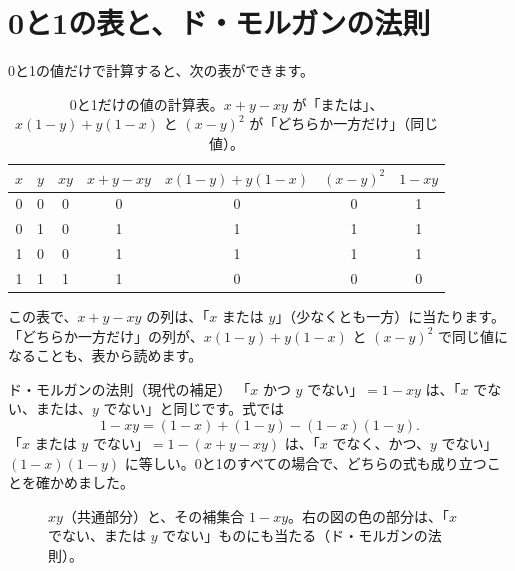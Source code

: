 \documentclass[a4paper,11pt,openany]{ltjsbook}
\begin{document}
\section{0と1の表と、ド・モルガンの法則}

0と1の値だけで計算すると、次の表ができます。

\begin{table}[htbp]
\centering
\begin{tabular}{cc|ccccc}
\toprule
$x$ & $y$ & $xy$ & $x+y-xy$ & $x(1-y)+y(1-x)$ & $(x-y)^2$ & $1-xy$\\
\midrule
0 & 0 & 0 & 0 & 0 & 0 & 1\\
0 & 1 & 0 & 1 & 1 & 1 & 1\\
1 & 0 & 0 & 1 & 1 & 1 & 1\\
1 & 1 & 1 & 1 & 0 & 0 & 0\\
\bottomrule
\end{tabular}
\caption{0と1だけの値の計算表。$x+y-xy$ が「または」、$x(1-y)+y(1-x)$ と $(x-y)^2$ が「どちらか一方だけ」（同じ値）。}
\end{table}

この表で、$x+y-xy$ の列は、「$x$ または $y$」（少なくとも一方）に当たります。「どちらか一方だけ」の列が、$x(1-y)+y(1-x)$ と $(x-y)^2$ で同じ値になることも、表から読めます。

\begin{examplebox}{ド・モルガンの法則（現代の補足）}
「$x$ かつ $y$ でない」$=1-xy$ は、「$x$ でない、または、$y$ でない」と同じです。式では
\[
1-xy=(1-x)+(1-y)-(1-x)(1-y).
\]
「$x$ または $y$ でない」$=1-(x+y-xy)$ は、「$x$ でなく、かつ、$y$ でない」$(1-x)(1-y)$ に等しい。0と1のすべての場合で、どちらの式も成り立つことを確かめました。
\end{examplebox}

\begin{figure}[htbp]
\centering
{}
\caption{$xy$（共通部分）と、その補集合 $1-xy$。右の図の色の部分は、「$x$ でない、または $y$ でない」ものにも当たる（ド・モルガンの法則）。}
\end{figure}
\end{document}
